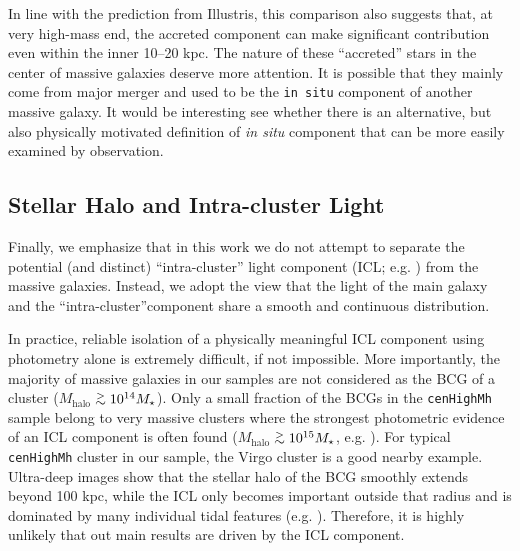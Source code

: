 \documentclass[a4paper,fleqn,usenatbib]{mnras}
\def\simgt{\lower.5ex\hbox{$\; \buildrel > \over {\sim} \;$}}
\def\rbcg{\texttt{cenHighMh}}
\def\mhalo{{$M_{\mathrm{halo}}$}}
\begin{document}
    In line with the prediction from Illustris, this comparison also 
    suggests that, at very high-mass end, the accreted component can make significant 
    contribution even within the inner 10--20 kpc. 
    The nature of these ``accreted'' stars in the center of massive galaxies deserve 
    more attention. 
    It is possible that they mainly come from major merger and used to be the 
    \texttt{in situ} component of another massive galaxy. 
    It would be interesting see whether there is an alternative, but also physically 
    motivated definition of \textit{in situ} component that can be more easily examined 
    by observation.   
    


\subsection{Stellar Halo and Intra-cluster Light}     
      
    Finally, we emphasize that in this work we do not attempt to separate the 
    potential (and distinct) ``intra-cluster'' light component (ICL; e.g. 
    \citealt{Carlberg1997, Lin2004, Gonzalez2005, Mihos2005}) from the massive 
    galaxies. 
    Instead, we adopt the view that the light of the main galaxy and the 
    ``intra-cluster''component share a smooth and continuous distribution. 
    
    In practice, reliable isolation of a physically meaningful ICL component using 
    photometry alone is extremely difficult, if not impossible. 
    More importantly, the majority of massive galaxies in our samples are not considered 
    as the BCG of a cluster (\mhalo{}$\simgt 10^{14}M_{\star}$). 
    Only a small fraction of the BCGs in the \rbcg{} sample belong to very 
    massive clusters where the strongest photometric evidence of an ICL component is 
    often found (\mhalo{}$\simgt 10^{15}M_{\star}$, e.g. \citealt{Presotto2014, 
    Burke2015}).
    For typical \rbcg{} cluster in our sample, the Virgo cluster is a good nearby 
    example.  
    Ultra-deep images show that the stellar halo of the BCG smoothly extends beyond 
    100 kpc, while the ICL only becomes important outside that radius and is dominated 
    by many individual tidal features (e.g. \citealt{Mihos2016}).
    Therefore, it is highly unlikely that out main results are driven by the ICL component.
\end{document}
